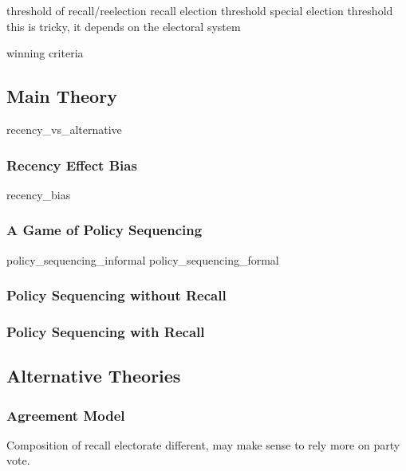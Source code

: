 \documentclass[hyphens, crop=false]{standalone}
\begin{document}
		
		threshold of recall/reelection
		recall election threshold
		special election threshold
		this is tricky, it depends on the electoral system
		
		winning criteria
		
		
		
		
	\subsection*{Main Theory}
		{recency_vs_alternative}
		
		
		
		\subsubsection*{Recency Effect Bias}
			{recency_bias}
		
	
		\subsubsection*{A Game of Policy Sequencing}
			{policy_sequencing_informal}
			{policy_sequencing_formal}
			
		
		\subsubsection*{Policy Sequencing without Recall}
		
		\subsubsection*{Policy Sequencing with Recall}
		
	\subsection*{Alternative Theories}
		
	
		\subsubsection*{Agreement Model}
		Composition of recall electorate different,
		may make sense to rely more on party vote.
		
\end{document}
